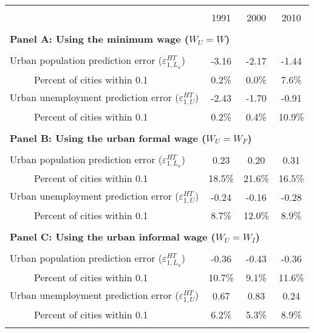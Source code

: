 \begin{tabular}{lccc}
\toprule &       &       &  \\
      & 1991  & 2000  & 2010 \bigstrut[b]\\
\cline{2-4}      &       &       &  \bigstrut[t]\\
\multicolumn{4}{l}{\boldmath{}\textbf{Panel A: Using the minimum wage  ($W_{U}=\underbar{W}$)}\unboldmath{}} \\
      &       &       &  \\
Urban population prediction error ($\varepsilon_{1,L_{u}}^{HT}$) & -3.16 & -2.17 & -1.44 \\
\medskip ~~~~~Percent of cities within 0.1 & 0.2\% & 0.0\% & 7.6\% \\
Urban unemployment prediction error ($\varepsilon_{1,U}^{HT}$) & -2.43 & -1.70 & -0.91 \\
~~~~~Percent of cities within 0.1 & 0.2\% & 0.4\% & 10.9\% \\
      &       &       &  \\
\multicolumn{4}{l}{\boldmath{}\textbf{Panel B: Using the urban formal wage  ($W_{U}=W_{F}$)}\unboldmath{}} \\
      &       &       &  \\
Urban population prediction error ($\varepsilon_{1,L_{u}}^{HT}$) & 0.23  & 0.20  & 0.31 \\
\medskip ~~~~~Percent of cities within 0.1 & 18.5\% & 21.6\% & 16.5\% \\
Urban unemployment prediction error ($\varepsilon_{1,U}^{HT}$) & -0.24 & -0.16 & -0.28 \\
~~~~~Percent of cities within 0.1 & 8.7\% & 12.0\% & 8.9\% \\
      &       &       &  \\
\multicolumn{4}{l}{\boldmath{}\textbf{Panel C: Using the urban informal wage  ($W_{U}=W_{I}$)}\unboldmath{}} \\
      &       &       &  \\
Urban population prediction error ($\varepsilon_{1,L_{u}}^{HT}$) & -0.36 & -0.43 & -0.36 \\
\medskip ~~~~~Percent of cities within 0.1 & 10.7\% & 9.1\% & 11.6\% \\
Urban unemployment prediction error ($\varepsilon_{1,U}^{HT}$) & 0.67  & 0.83  & 0.24 \\
~~~~~Percent of cities within 0.1 & 6.2\% & 5.3\% & 8.9\% \\
      &       &       &  \\

\end{tabular}
